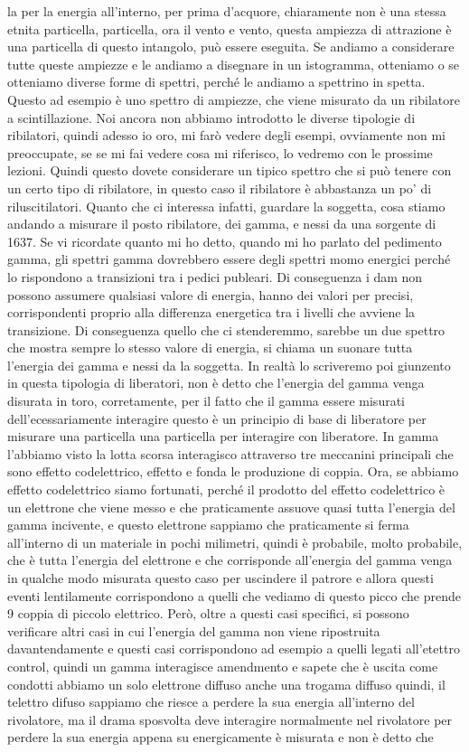 la per la energia all'interno, per prima d'acquore, chiaramente non è una stessa etnita particella, particella, ora il vento e vento, questa ampiezza di attrazione è una particella di questo intangolo, può essere eseguita. Se andiamo a considerare tutte queste ampiezze e le andiamo a disegnare in un istogramma, otteniamo o se otteniamo diverse forme di spettri, perché le andiamo a spettrino in spetta. Questo ad esempio è uno spettro di ampiezze, che viene misurato da un ribilatore a scintillazione. Noi ancora non abbiamo introdotto le diverse tipologie di ribilatori, quindi adesso io oro, mi farò vedere degli esempi, ovviamente non mi preoccupate, se se mi fai vedere cosa mi riferisco, lo vedremo con le prossime lezioni. Quindi questo dovete considerare un tipico spettro che si può tenere con un certo tipo di ribilatore, in questo caso il ribilatore è abbastanza un po' di riluscitilatori. Quanto che ci interessa infatti, guardare la soggetta, cosa stiamo andando a misurare il posto ribilatore, dei gamma, e nessi da una sorgente di 1637. Se vi ricordate quanto mi ho detto, quando mi ho parlato del pedimento gamma, gli spettri gamma dovrebbero essere degli spettri momo energici perché lo rispondono a transizioni tra i pedici publeari. Di conseguenza i dam non possono assumere qualsiasi valore di energia, hanno dei valori per precisi, corrispondenti proprio alla differenza energetica tra i livelli che avviene la transizione. Di conseguenza quello che ci stenderemmo, sarebbe un due spettro che mostra sempre lo stesso valore di energia, si chiama un suonare tutta l'energia dei gamma e nessi da la soggetta. In realtà lo scriveremo poi giunzento in questa tipologia di liberatori, non è detto che l'energia del gamma venga disurata in toro, corretamente, per il fatto che il gamma essere misurati dell'ecessariamente interagire questo è un principio di base di liberatore per misurare una particella una particella per interagire con liberatore. In gamma l'abbiamo visto la lotta scorsa interagisco attraverso tre meccanini principali che sono effetto codelettrico, effetto e fonda le produzione di coppia. Ora, se abbiamo effetto codelettrico siamo fortunati, perché il prodotto del effetto codelettrico è un elettrone che viene messo e che praticamente assuove quasi tutta l'energia del gamma incivente, e questo elettrone sappiamo che praticamente si ferma all'interno di un materiale in pochi milimetri, quindi è probabile, molto probabile, che è tutta l'energia del elettrone e che corrisponde all'energia del gamma venga in qualche modo misurata questo caso per uscindere il patrore e allora questi eventi lentilamente corrispondono a quelli che vediamo di questo picco che prende 9 coppia di piccolo elettrico. Però, oltre a questi casi specifici, si possono verificare altri casi in cui l'energia del gamma non viene ripostruita davantendamente e questi casi corrispondono ad esempio a quelli legati all'etettro control, quindi un gamma interagisce amendmento e sapete che è uscita come condotti abbiamo un solo elettrone diffuso anche una trogama diffuso quindi, il telettro difuso sappiamo che riesce a perdere la sua energia all'interno del rivolatore, ma il drama sposvolta deve interagire normalmente nel rivolatore per perdere la sua energia appena su energicamente è misurata e non è detto che 